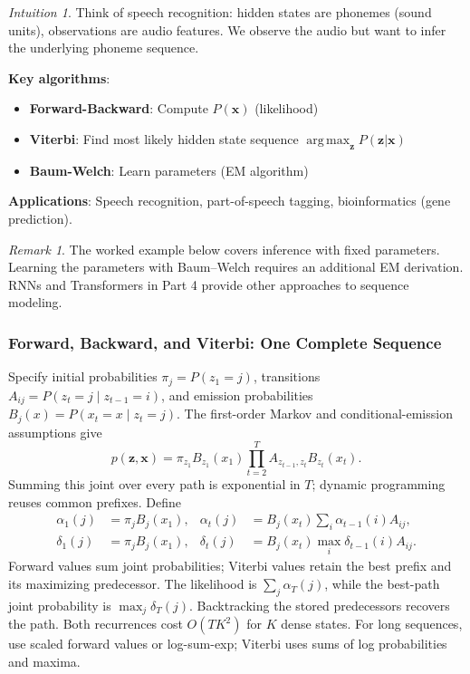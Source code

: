 \documentclass[11pt,twoside]{article}
\numberwithin{equation}{section}
\DeclareMathOperator*{\argmax}{arg\,max}
\newcommand{\vect}[1]{\bm{#1}}
\theoremstyle{plain}
\theoremstyle{definition}
\theoremstyle{remark}
\newtheorem{remark}[theorem]{Remark}
\newtheorem{intuition}[theorem]{Intuition}
\begin{document}
\begin{intuition}
Think of speech recognition: hidden states are phonemes (sound units), observations are audio features. We observe the audio but want to infer the underlying phoneme sequence.
\end{intuition}

\textbf{Key algorithms}:
\begin{itemize}
\item \textbf{Forward-Backward}: Compute $P(\vect{x})$ (likelihood)
\item \textbf{Viterbi}: Find most likely hidden state sequence $\argmax_{\vect{z}} P(\vect{z}|\vect{x})$
\item \textbf{Baum-Welch}: Learn parameters (EM algorithm)
\end{itemize}

\textbf{Applications}: Speech recognition, part-of-speech tagging, bioinformatics (gene prediction).

\begin{remark}
The worked example below covers inference with fixed parameters. Learning the parameters with Baum--Welch requires an additional EM derivation. RNNs and Transformers in Part 4 provide other approaches to sequence modeling.
\end{remark}

\subsubsection{Forward, Backward, and Viterbi: One Complete Sequence}
Specify initial probabilities $\pi_j=P(z_1=j)$, transitions $A_{ij}=P(z_t=j\mid z_{t-1}=i)$, and emission probabilities $B_j(x)=P(x_t=x\mid z_t=j)$. The first-order Markov and conditional-emission assumptions give
\[
p(\vect z,\vect x)=\pi_{z_1}B_{z_1}(x_1)\prod_{t=2}^T A_{z_{t-1},z_t}B_{z_t}(x_t).
\]
Summing this joint over every path is exponential in $T$; dynamic programming reuses common prefixes. Define
\begin{align*}
\alpha_1(j)&=\pi_jB_j(x_1),&
\alpha_t(j)&=B_j(x_t)\sum_i\alpha_{t-1}(i)A_{ij},\\
\delta_1(j)&=\pi_jB_j(x_1),&
\delta_t(j)&=B_j(x_t)\max_i\delta_{t-1}(i)A_{ij}.
\end{align*}
Forward values sum joint probabilities; Viterbi values retain the best prefix and its maximizing predecessor. The likelihood is $\sum_j\alpha_T(j)$, while the best-path joint probability is $\max_j\delta_T(j)$. Backtracking the stored predecessors recovers the path. Both recurrences cost $O(TK^2)$ for $K$ dense states. For long sequences, use scaled forward values or log-sum-exp; Viterbi uses sums of log probabilities and maxima.
\end{document}
